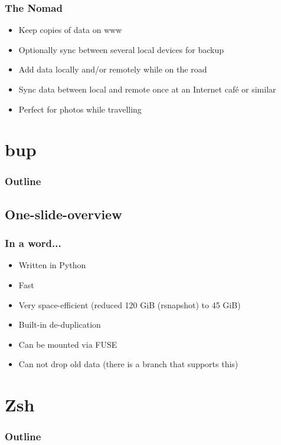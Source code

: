\documentclass[t]{beamer}
\begin{document}
\begin{frame}
	\frametitle{The Nomad}
	\begin{itemize}
		\item Keep copies of data on www
		\item Optionally sync between several local devices for backup
		\item Add data locally and/or remotely while on the road
		\item Sync data between local and remote once at an Internet café or similar
		\item Perfect for photos while travelling
	\end{itemize}
\end{frame}


\section{bup}

\begin{frame}
	\frametitle{Outline}
	\tableofcontents[currentsection]
\end{frame}

\subsection{One-slide-overview}

\begin{frame}
	\frametitle{In a word...}
	\begin{itemize}
		\item Written in Python
		\item Fast
		\item Very space-efficient (reduced 120 GiB (rsnapshot) to 45 GiB)
		\item Built-in de-duplication
		\item Can be mounted via FUSE
		\item Can not drop old data (there is a branch that supports this)
	\end{itemize}
\end{frame}


\section{Zsh}

\begin{frame}
	\frametitle{Outline}
	\tableofcontents[currentsection]
\end{frame}
\end{document}
